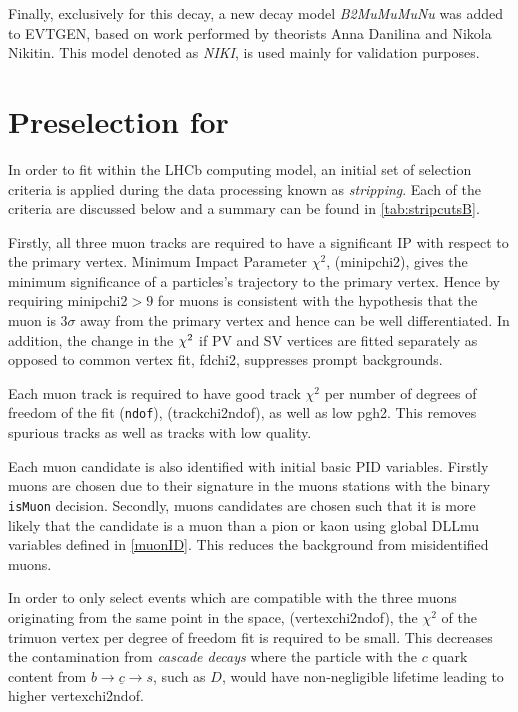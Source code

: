 Finally, exclusively for this decay, a new decay model \textit{B2MuMuMuNu} was added to EVTGEN, based on work performed by theorists Anna Danilina and  Nikola Nikitin\cite{Danilina:2018uzr}. This model denoted as \textit{NIKI}, is used mainly for validation purposes. 


\section{Preselection for \Bmumumu}
\label{preselection}

In order to fit within the LHCb computing model, an initial set of selection criteria is applied during the data processing known as \textit{stripping}. Each of the criteria are discussed below and a summary can be found in \autoref{tab:stripcutsB}.


Firstly, all three muon tracks are required to have a significant \gls{IP} with respect to the primary vertex. Minimum Impact Parameter $\chi^{2}$, (\gls{minipchi2}), gives the minimum significance of a particles's trajectory to the primary vertex. Hence by requiring \gls{minipchi2}$>9$ for muons is consistent with the hypothesis that the muon is $3\sigma$ away from the primary vertex and hence can be well differentiated. In addition, the change in the $\chi^2$ if \gls{PV} and \gls{SV} vertices are fitted separately as opposed to common vertex fit, \gls{fdchi2}, suppresses prompt backgrounds. 

Each muon track is required to have good track $\chi^{2}$ per number of degrees of freedom of the fit (\texttt{ndof}), (\gls{trackchi2ndof}), as well as low \gls{pgh2}. This removes spurious tracks as well as tracks with low quality.

Each muon candidate is also identified with initial basic \gls{PID} variables. Firstly muons are chosen due to their signature in the muons stations with the binary \texttt{isMuon} decision. Secondly, muons candidates are chosen such that it is more likely that the candidate is a muon than a pion or kaon using global DLLmu variables defined in \autoref{muonID}. This reduces the background from misidentified muons.

In order to only select events which are compatible with the three muons originating from the same point in the space, (\gls{vertexchi2ndof}), the $\chi^{2}$ of the trimuon vertex per degree of freedom fit is required to be small. This decreases the contamination from \textit{cascade decays} where the particle with the $c$ quark content from $b \rightarrow \underline{c} \rightarrow s$, such as $D$, would have non-negligible lifetime leading to higher \gls{vertexchi2ndof}. 

